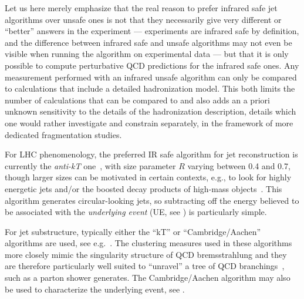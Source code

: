 %
%
Let us here merely emphasize that the real reason to prefer infrared safe
jet algorithms over unsafe ones 
is not that they  necessarily give very different
or ``better'' answers in the experiment --- experiments are infrared safe by
definition, and the difference between infrared safe and unsafe
algorithms may not even be visible when running the
algorithm on experimental data --- but that it is only possible to
compute perturbative QCD predictions for the infrared safe ones. Any
measurement performed with an infrared unsafe algorithm can only be
compared to calculations that include a detailed hadronization model. This
both limits the number of calculations that can be compared to and
also adds an a priori unknown sensitivity to the details of the 
hadronization description, details which one would rather investigate and
constrain separately, in the framework of more dedicated fragmentation
studies. 

%
%
For LHC phenomenology, the preferred IR safe algorithm for jet
reconstruction is currently the \emph{anti-kT}
one~\cite{Cacciari:2008gp}, with size parameter
$R$ varying between 0.4 and 0.7, though larger sizes can be
motivated in certain contexts, e.g., to look for highly energetic jets
and/or the boosted decay products of high-mass
objects~\cite{Abdesselam:2010pt,Altheimer:2012mn}.   
%
This algorithm generates circular-looking
jets, so subtracting off the energy believed to be associated with the
\emph{underlying event} (UE, see ) 
is particularly simple. 

%
%
%
For jet substructure, typically either the
``kT'' or ``Cambridge/Aachen'' algorithms are used,
see e.g.\ \cite{Abdesselam:2010pt,Altheimer:2012mn}. 
The clustering measures used in these algorithms more closely mimic
the singularity structure of QCD bremsstrahlung and they are therefore
particularly well suited to ``unravel'' a tree of QCD branchings~\cite{Salam:2010zt}, 
such as a parton shower generates. The Cambridge/Aachen algorithm may
also be used to characterize the underlying 
event, see \cite{Cacciari:2009dp}.
